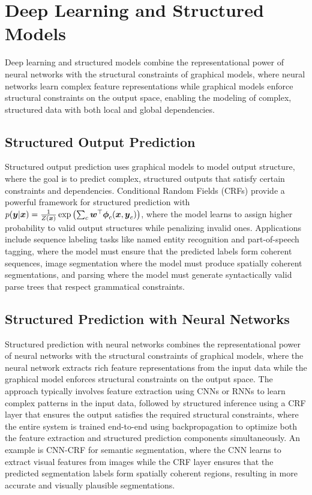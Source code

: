 
\section{Deep Learning and Structured Models }
\label{sec:deep-structured}

Deep learning and structured models combine the representational power of neural networks with the structural constraints of graphical models, where neural networks learn complex feature representations while graphical models enforce structural constraints on the output space, enabling the modeling of complex, structured data with both local and global dependencies.

\subsection{Structured Output Prediction}

Structured output prediction uses graphical models to model output structure, where the goal is to predict complex, structured outputs that satisfy certain constraints and dependencies. Conditional Random Fields (CRFs) provide a powerful framework for structured prediction with $p(\boldsymbol{y}|\boldsymbol{x}) = \frac{1}{Z(\boldsymbol{x})} \exp\left(\sum_c \boldsymbol{w}^\top \boldsymbol{\phi}_c(\boldsymbol{x}, \boldsymbol{y}_c)\right)$, where the model learns to assign higher probability to valid output structures while penalizing invalid ones. Applications include sequence labeling tasks like named entity recognition and part-of-speech tagging, where the model must ensure that the predicted labels form coherent sequences, image segmentation where the model must produce spatially coherent segmentations, and parsing where the model must generate syntactically valid parse trees that respect grammatical constraints.

\subsection{Structured Prediction with Neural Networks}

Structured prediction with neural networks combines the representational power of neural networks with the structural constraints of graphical models, where the neural network extracts rich feature representations from the input data while the graphical model enforces structural constraints on the output space. The approach typically involves feature extraction using CNNs or RNNs to learn complex patterns in the input data, followed by structured inference using a CRF layer that ensures the output satisfies the required structural constraints, where the entire system is trained end-to-end using backpropagation to optimize both the feature extraction and structured prediction components simultaneously. An example is CNN-CRF for semantic segmentation, where the CNN learns to extract visual features from images while the CRF layer ensures that the predicted segmentation labels form spatially coherent regions, resulting in more accurate and visually plausible segmentations.

